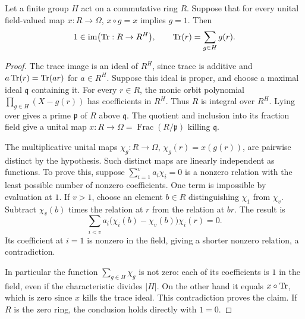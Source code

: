 \begin{lemma}\label{wup:algebraic-trace}
Let a finite group \(H\) act on a commutative ring \(R\). Suppose
that for every unital field-valued map \(x:R\to\Omega\),
\(x\circ g=x\) implies \(g=1\). Then
\[
 1\in\operatorname{im}\bigl(\operatorname{Tr}:R\to R^H\bigr),
 \qquad \operatorname{Tr}(r)=\sum_{g\in H}g(r).
\]
\end{lemma}

\begin{proof}
The trace image is an ideal of \(R^H\), since trace is additive
and \(a\operatorname{Tr}(r)=\operatorname{Tr}(ar)\) for \(a\in R^H\). Suppose this ideal
is proper, and choose a maximal ideal \(\mathfrak q\) containing
it. For every \(r\in R\), the monic orbit polynomial
\(\prod_{g\in H}(X-g(r))\) has coefficients in \(R^H\).
Thus \(R\) is integral over \(R^H\). Lying over gives a prime
\(\mathfrak p\) of \(R\) above \(\mathfrak q\). The quotient and
inclusion into its fraction field give a unital map
\(x:R\to\Omega=\operatorname{Frac}(R/\mathfrak p)\) killing
\(\mathfrak q\).

The multiplicative unital maps
\(\chi_g:R\to\Omega\), \(\chi_g(r)=x(g(r))\), are pairwise
distinct by the hypothesis. Such distinct maps are linearly
independent as functions. To prove this, suppose
\(\sum_{i=1}^v a_i\chi_i=0\) is a nonzero relation with the
least possible number of nonzero coefficients. One term is
impossible by evaluation at \(1\). If \(v>1\), choose an element
\(b\in R\) distinguishing \(\chi_1\) from \(\chi_v\).
Subtract \(\chi_v(b)\) times the relation at \(r\) from the
relation at \(br\). The result is
\[
 \sum_{i<v}a_i\bigl(\chi_i(b)-\chi_v(b)\bigr)\chi_i(r)=0.
\]
Its coefficient at \(i=1\) is nonzero in the field, giving a
shorter nonzero relation, a contradiction.

In particular the function \(\sum_{g\in H}\chi_g\) is not zero:
each of its coefficients is \(1\) in the field, even if the
characteristic divides \(|H|\). On the other hand it equals
\(x\circ\operatorname{Tr}\), which is zero since \(x\) kills the trace ideal.
This contradiction proves the claim. If \(R\) is the zero ring,
the conclusion holds directly with \(1=0\).
\end{proof}

